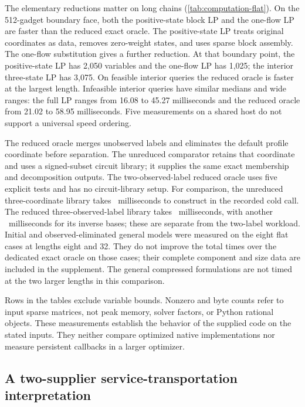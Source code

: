 

The elementary reductions matter on long chains
(\cref{tab:computation-flat}). On the 512-gadget boundary face, both
the positive-state block LP and the one-flow LP are faster than the reduced
exact oracle. The positive-state LP treats original coordinates as data,
removes zero-weight states, and uses sparse block assembly. The one-flow
substitution gives a further reduction. At that boundary point,
the positive-state LP has 2,050 variables and the one-flow LP has 1,025;
the interior three-state LP has 3,075.
On feasible interior queries the reduced oracle is faster at the largest
length. Infeasible interior queries have similar medians and wide ranges:
the full LP ranges from 16.08 to 45.27 milliseconds and the reduced oracle
from 21.02 to 58.95 milliseconds. Five measurements on a shared host do
not support a universal speed ordering.

The reduced oracle merges unobserved labels and eliminates the default
profile coordinate before separation. The unreduced comparator retains
that coordinate and uses a signed-subset circuit library; it supplies the
same exact membership and decomposition outputs. The two-observed-label
reduced oracle uses five explicit tests and has no circuit-library setup.
For comparison, the unreduced three-coordinate library takes
\BenchOldCold\ milliseconds to construct in the recorded cold call.
The reduced three-observed-label library
takes \BenchNewThreeCold\ milliseconds, with another
\BenchNewThreeBases\ milliseconds for its inverse bases; these are separate
from the two-label workload. Initial and observed-eliminated general models
were measured on the eight flat cases at lengths eight and 32. They do not
improve the total times over the dedicated exact oracle on those cases;
their complete component and size data are included in the supplement.
The general compressed formulations are not timed at the two larger lengths
in this comparison.

Rows in the tables exclude variable bounds. Nonzero and byte counts refer
to input sparse matrices, not peak memory, solver factors, or Python rational
objects. These measurements establish the behavior of the supplied code on
the stated inputs. They neither compare optimized native implementations
nor measure persistent callbacks in a larger optimizer.

\subsection{A two-supplier service-transportation interpretation}

